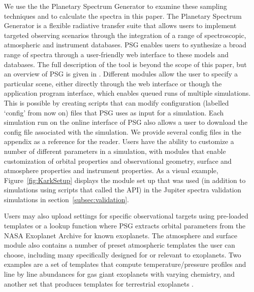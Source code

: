 \documentclass[12pt, letterpaper]{aastex631}
\begin{document}
We use the the Planetary Spectrum Generator to examine these sampling techniques and to calculate the spectra in this paper.  The Planetary Spectrum Generator is a flexible radiative transfer suite that allows users to implement targeted observing scenarios through the integration of a range of spectroscopic,  atmospheric and instrument databases.  PSG enables users to synthesize a broad range of spectra through a user-friendly web interface to these models and  databases.  The full description of the tool is beyond the scope of this paper, but an overview of PSG is given in \textcite{2018JQSRT.217...86V}.  Different modules allow the user to specify a particular scene, either directly through the web interface or though the application program interface, which enables queued runs of multiple simulations. This is possible by creating scripts that can modify configuration (labelled `config' from now on) files that PSG uses as input for a simulation.  Each simulation run on the online interface of PSG also allows a user to download the config file associated with the simulation. We provide several config files in the appendix as a reference for the reader. Users have the ability to customize a number of different parameters in a simulation, with modules that enable customization of orbital properties and observational geometry, surface and atmosphere properties and instrument properties. As a visual example, Figure~\ref{fig:KarkSetup} displays the module set up that was used (in addition to simulations using scripts that called the API) in the Jupiter spectra validation simulations in section~\ref{subsec:validation}.

Users may also upload settings for specific observational targets using pre-loaded templates or a lookup function where PSG extracts orbital parameters from the NASA Exoplanet Archive \citep{2013PASP..125..989A} for known exoplanets. The atmosphere and surface module also contains a number of preset atmospheric templates the user can choose, including many specifically designed for or relevant to exoplanets. Two examples are a set of templates that compute temperature/pressure profiles \citep{2014A&A...562A.133P} and line by line abundances \citep{Kempton_2017} for gas giant exoplanets with varying chemistry, and another set that produces templates for terrestrial exoplanets \citep{2017EPSC...11..298T}.

\end{document}
